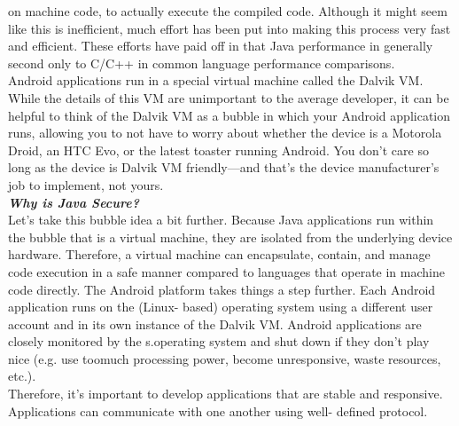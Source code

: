 on machine code, to actually execute the compiled code. Although it might
seem like this is inefficient, much effort has been put into making this
process very fast and efficient. These efforts have paid off in that Java
performance in generally second only to C/C++ in common language
performance comparisons.\\
Android applications run in a special virtual machine called the Dalvik
VM. While the details of this VM are unimportant to the average
developer, it can be helpful to think of the Dalvik VM as a bubble in which
your Android application runs, allowing you to not have to worry about
whether the device is a Motorola Droid, an HTC Evo, or the latest toaster
running Android. You don’t care so long as the device is Dalvik VM
friendly—and that’s the device manufacturer’s job to implement, not
yours.\\
\textbf{\emph{Why is Java Secure?}}\\
Let’s take this bubble idea a bit further. Because Java applications run
within the bubble that is a virtual machine, they are isolated from the
underlying device hardware. Therefore, a virtual machine can encapsulate,
contain, and manage code execution in a safe manner compared to
languages that operate in machine code directly. The Android platform
takes things a step further. Each Android application runs on the (Linux-
based) operating system using a different user account and in its own
instance of the Dalvik VM. Android applications are closely monitored by
the s.operating system and shut down if they don’t play nice (e.g. use toomuch processing power, become unresponsive, waste resources, etc.).\\
Therefore, it’s important to develop applications that are stable and
responsive. Applications can communicate with one another using well-
defined protocol.



